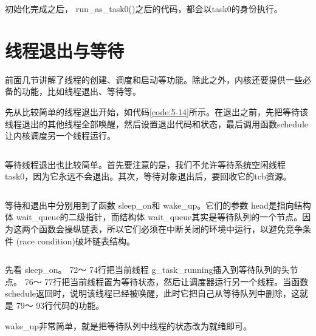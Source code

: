 \documentclass[main.tex]{subfiles}
\begin{document}
\begin{CJK*}{UTF8}{song}
\par
初始化完成之后， run\_\-as\_\-task0()之后的代码，都会以task0的身份执行。

\section{线程退出与等待}
前面几节讲解了线程的创建、调度和启动等功能。除此之外，内核还要提供一些必备的功能，比如线程退出、等待等。

\par
先从比较简单的线程退出开始，如代码\ref{code:5-14}所示。在退出之前，先把等待该线程退出的其他线程全部唤醒，然后设置退出代码和状态，最后调用函数schedule让内核调度另一个线程运行。

\begin{code}
\label{code:5-14}
\inputminted[firstline=205,lastline=222,linenos,numbersep=5pt,frame=lines,framesep=2mm]{c}{src/chapter05/kernel/task.c}
\end{code}

等待线程退出也比较简单。首先要注意的是，我们不允许等待系统空闲线程task0，因为它永远不会退出。其次，等待对象退出后，要回收它的tcb资源。

\begin{code}
\label{code:5-15}
\inputminted[firstline=224,lastline=265,linenos,numbersep=5pt,frame=lines,framesep=2mm]{c}{src/chapter05/kernel/task.c}
\end{code}

等待和退出中分别用到了函数 sleep\_\-on和 wake\_\-up。它们的参数 head是指向结构体 wait\_\-queue的二级指针，而结构体 wait\_\-queue其实是等待队列的一个节点。因为这两个函数会操纵链表，所以它们必须在中断关闭的环境中运行，以避免竞争条件 (race condition)破坏链表结构。

\begin{code}
\label{code:5-16}
\inputminted[firstline=120,lastline=123,linenos,numbersep=5pt,frame=lines,framesep=2mm]{c}{src/chapter05/kernel/kernel.h}
\end{code}

先看 sleep\_\-on。 72～ 74行把当前线程 g\_\-task\_\-running插入到等待队列的头节点。 76～ 77行把当前线程置为等待状态，然后让调度器运行另一个线程。当函数 schedule返回时，说明该线程已经被唤醒，此时它把自己从等待队列中删除，这就是 79～ 93行代码的功能。

\par
 wake\_\-up非常简单，就是把等待队列中线程的状态改为就绪即可。
 

\end{CJK*}
\end{document}
